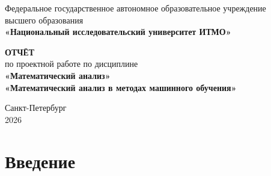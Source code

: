 \documentclass[12pt,a4paper]{article}
\begin{document}
\begin{titlepage}
    \begin{center}
        {\small
        Федеральное государственное автономное образовательное учреждение\\
        высшего образования\\[0.3em]
        \textbf{«Национальный исследовательский университет ИТМО»}\\[0.8em]
        }

        \vfill

        {\Large \textbf{ОТЧЁТ}}\\[0.8em]
        {\large по проектной работе по дисциплине}\\[0.4em]
        {\large \textbf{«Математический анализ»}}\\[1.5em]

        {\LARGE
        \textbf{«Математический анализ в методах машинного обучения»}
        }

        \vfill


        \vfill

        Санкт-Петербург\\
        2026
    \end{center}
\end{titlepage}

\tableofcontents
\newpage

\section*{Введение}
\end{document}
